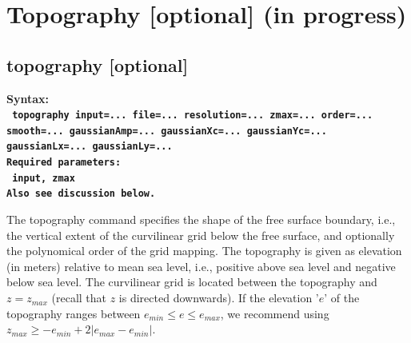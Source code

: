 \documentclass[11pt]{report}
\begin{document}
\section{Topography [optional] (in progress)}

\subsection{topography [optional]}
\label{keyword:topo}
\begin{flushleft}
\bf
Syntax:\\
\tt 
topography input=... file=... resolution=... zmax=... order=... smooth=... gaussianAmp=... gaussianXc=... gaussianYc=... gaussianLx=... gaussianLy=...\\
\bf 
Required parameters:\\
\tt 
input, zmax\\
\rm Also see discussion below.
\end{flushleft}
The topography command specifies the shape of the free surface boundary, i.e., the vertical extent
of the curvilinear grid below the free surface, and optionally the polynomical order of the grid
mapping. The topography is given as elevation (in meters) relative to mean sea level, i.e., positive
above sea level and negative below sea level. The curvilinear grid is located between the topography
and $z=z_{max}$ (recall that $z$ is directed downwards). If the elevation '$e$' of the topography
ranges between $e_{min}\leq e \leq e_{max}$, we recommend using $z_{max} \geq -e_{min} + 2|e_{max} -
e_{min}|$.
\end{document}
